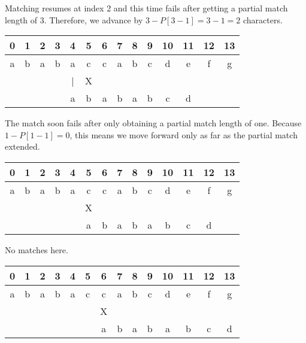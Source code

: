 Matching resumes at index 2 and this time fails after getting a partial match length of 3.
Therefore, we advance by $3 - P[3 - 1] = 3 - 1 = 2$ characters.

\begin{table}[h]
	\begin{center}
		\begin{tabular}{ | c | c | c | c | c | c | c | c | c | c | c | c | c | c | }
			\hline
			0 & 1 & 2 & 3 & 4 & 5 & 6 & 7 & 8 & 9 & 10 & 11 & 12 & 13 \\ \hline
			a & b & a & b & a & c & c & a & b & c & d & e & f & g \\ \hline
			  &   &   &   & | & X &   &   &   &   &   &   &   &   \\ \hline
			  &   &   &   & a & b & a & b & a & b & c & d &   &   \\ \hline
		\end{tabular}
	\end{center}
\end{table}

The match soon fails after only obtaining a partial match length of one.
Because $1 - P[1 - 1] = 0$, this means we move forward only as far as the partial match extended.

\begin{table}[h!]
	\begin{center}
		\begin{tabular}{ | c | c | c | c | c | c | c | c | c | c | c | c | c | c | }
			\hline
			0 & 1 & 2 & 3 & 4 & 5 & 6 & 7 & 8 & 9 & 10 & 11 & 12 & 13 \\ \hline
			a & b & a & b & a & c & c & a & b & c & d & e & f & g \\ \hline
			  &   &   &   &   & X &   &   &   &   &   &   &   &   \\ \hline
			  &   &   &   &   & a & b & a & b & a & b & c & d &   \\ \hline
		\end{tabular}
	\end{center}
\end{table}

No matches here.

\begin{table}[h!]
	\begin{center}
		\begin{tabular}{ | c | c | c | c | c | c | c | c | c | c | c | c | c | c | }
			\hline
			0 & 1 & 2 & 3 & 4 & 5 & 6 & 7 & 8 & 9 & 10 & 11 & 12 & 13 \\ \hline
			a & b & a & b & a & c & c & a & b & c & d & e & f & g \\ \hline
			  &   &   &   &   &   & X &   &   &   &   &   &   &   \\ \hline
			  &   &   &   &   &   & a & b & a & b & a & b & c & d \\ \hline
		\end{tabular}
	\end{center}
\end{table}

